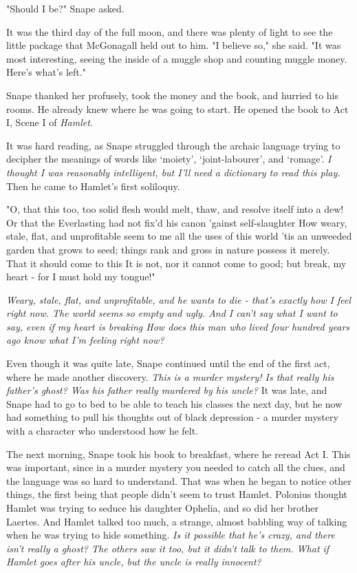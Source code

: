 "Should I be?" Snape asked.

It was the third day of the full moon, and there was plenty of light to see the little package that McGonagall held out to him. "I believe so," she said. "It was most interesting, seeing the inside of a muggle shop and counting muggle money. Here's what's left."

Snape thanked her profusely, took the money and the book, and hurried to his rooms. He already knew where he was going to start. He opened the book to Act I, Scene I of \emph{Hamlet}.

It was hard reading, as Snape struggled through the archaic language trying to decipher the meanings of words like `moiety', `joint-labourer', and `romage'. \emph{I thought I was reasonably intelligent, but I'll need a dictionary to read this play.} Then he came to Hamlet's first soliloquy.

"O, that this too, too solid flesh would melt, thaw, and resolve itself into a dew! Or that the Everlasting had not fix'd his canon 'gainst self-slaughter{\el} How weary, stale, flat, and unprofitable seem to me all the uses of this world{\el} 'tis an unweeded garden that grows to seed; things rank and gross in nature possess it merely. That it should come to this{\el} It is not, nor it cannot come to good; but break, my heart - for I must hold my tongue!"

\emph{Weary, stale, flat, and unprofitable, and he wants to die - that's exactly how I feel right now. The world seems so empty and ugly. And I can't say what I want to say, even if my heart is breaking{\el} How does this man who lived four hundred years ago know what I'm feeling right now?}

Even though it was quite late, Snape continued until the end of the first act, where he made another discovery. \emph{This is a murder mystery! Is that really his father's ghost? Was his father really murdered by his uncle?} It was late, and Snape had to go to bed to be able to teach his classes the next day, but he now had something to pull his thoughts out of black depression - a murder mystery with a character who understood how he felt.

The next morning, Snape took his book to breakfast, where he reread Act I. This was important, since in a murder mystery you needed to catch all the clues, and the language was so hard to understand. That was when he began to notice other things, the first being that people didn't seem to trust Hamlet. Polonius thought Hamlet was trying to seduce his daughter Ophelia, and so did her brother Laertes. And Hamlet talked too much, a strange, almost babbling way of talking when he was trying to hide something. \emph{Is it possible that he's crazy, and there isn't really a ghost? The others saw it too, but it didn't talk to them. What if Hamlet goes after his uncle, but the uncle is really innocent?}

